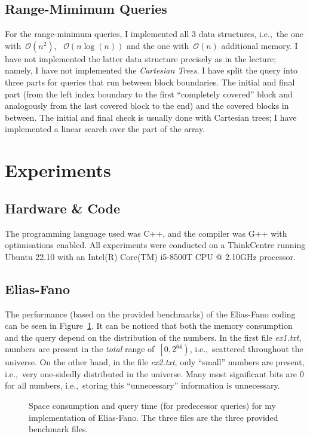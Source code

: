 \documentclass[a4paper,UKenglish,cleveref, autoref, thm-restate]{lipics-v2021}
\newcommand{\ie}{i.e.,\xspace~}
\begin{document}
	\subsection{Range-Mimimum Queries}
	For the range-minimum queries, I implemented all 3 data structures, \ie the one with~$\mathcal{O}\left(n^2\right)$, ~$\mathcal{O}\left(n \log\left(n\right)\right)$ and the one with~$\mathcal{O}\left(n\right)$ additional memory. I have not implemented the latter data structure precisely as in the lecture; namely, I have not implemented the \textit{Cartesian Trees}. I have split the query into three parts for queries that run between block boundaries. The initial and final part (from the left index boundary to the first ``completely covered'' block and analogously from the last covered block to the end) and the covered blocks in between. The initial and final check is usually done with Cartesian trees; I have implemented a linear search over the part of the array.
	
	\section{Experiments}
	\subsection{Hardware \& Code}
	The programming language used was C++, and the compiler was G++ with optimisations enabled. All experiments were conducted on a ThinkCentre running Ubuntu 22.10 with an Intel(R) Core(TM) i5-8500T CPU @ 2.10GHz processor.
	\subsection{Elias-Fano}
	The performance (based on the provided benchmarks) of the Elias-Fano coding can be seen in Figure~\ref{fig:ef}. It can be noticed that both the memory consumption and the query depend on the distribution of the numbers. In the first file \textit{ex1.txt},  numbers are present in the \textit{total} range of~$\left[0, 2^{64}\right)$, \ie scattered throughout the universe. On the other hand, in the file \textit{ex2.txt}, only ``small'' numbers are present, \ie very one-sidedly distributed in the universe. Many most significant bits are 0 for all numbers, \ie storing this ``unnecessary'' information is unnecessary.	\begin{figure}[htbp]
		\begin{center}
			\resizebox{.9\linewidth}{!}{
				
			}
			\caption{Space consumption and query time (for  predecessor queries) for my implementation of Elias-Fano. The three files are the three provided benchmark files.}
			\label{fig:ef}
		\end{center}
	\end{figure}
\end{document}
